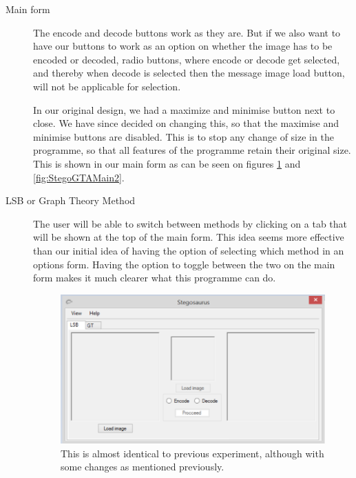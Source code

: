 \begin{description}
\item[Main form]
The encode and decode buttons work as they are.
But if we also want to have our buttons to work as an option on whether the image has to be encoded or decoded, radio buttons, where encode or decode get selected, and thereby when decode is selected then the message image load button, will not be applicable for selection.

In our original design, we had a maximize and minimise button next to close.
We have since decided on changing this, so that the maximise and minimise buttons are disabled.
This is to stop any change of size in the programme, so that all features of the programme retain their original size.
This is shown in our main form as can be seen on figures \ref{fig:StegoLSBMain} and \ref{fig:StegoGTAMain2}.

\item[LSB or Graph Theory Method]
The user will be able to switch between methods by clicking on a tab that will be shown at the top of the main form.
This idea seems more effective than our initial idea of having the option of selecting which method in an options form.
Having the option to toggle between the two on the main form makes it much clearer what this programme can do.

\begin{figure}
	\centering
	\includegraphics[width=1\textwidth]{figures/StegoLSBMain.png}
	\caption{This is almost identical to previous experiment, although with some changes as mentioned previously.}
	\label{fig:StegoLSBMain}
\end{figure}


\end{description}

